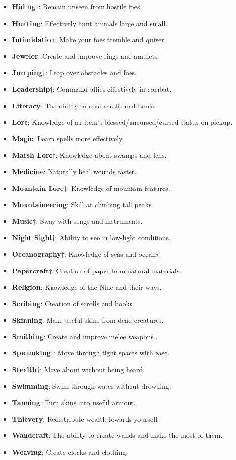 \begin{itemize}
\item {\bf Hiding}$\dagger$: Remain unseen from hostile foes.
\item {\bf Hunting}: Effectively hunt animals large and small. 
\item {\bf Intimidation}: Make your foes tremble and quiver. 
\item {\bf Jeweler}: Create and improve rings and amulets. 
\item {\bf Jumping}$\dagger$: Leap over obstacles and foes.
\item {\bf Leadership}$\dagger$: Command allies effectively in combat. 
\item {\bf Literacy}: The ability to read scrolls and books.
\item {\bf Lore}: Knowledge of an item's blessed/uncursed/cursed status on pickup.
\item {\bf Magic}: Learn spells more effectively. 
\item {\bf Marsh Lore}$\dagger$: Knowledge about swamps and fens. 
\item {\bf Medicine}: Naturally heal wounds faster. 
\item {\bf Mountain Lore}$\dagger$: Knowledge of mountain features. 
\item {\bf Mountaineering}: Skill at climbing tall peaks. 
\item {\bf Music}$\dagger$: Sway with songs and instruments. 
\item {\bf Night Sight}$\dagger$: Ability to see in low-light conditions. 
\item {\bf Oceanography}$\dagger$: Knowledge of seas and oceans. 
\item {\bf Papercraft}$\dagger$: Creation of paper from natural materials. 
\item {\bf Religion}: Knowledge of the Nine and their ways. 
\item {\bf Scribing}: Creation of scrolls and books. 
\item {\bf Skinning}: Make useful skins from dead creatures. 
\item {\bf Smithing}: Create and improve melee weapons.
\item {\bf Spelunking}$\dagger$: Move through tight spaces with ease.
\item {\bf Stealth}$\dagger$: Move about without being heard.
\item {\bf Swimming}: Swim through water without drowning.
\item {\bf Tanning}: Turn skins into useful armour.
\item {\bf Thievery}: Redistribute wealth towards yourself.
\item {\bf Wandcraft}: The ability to create wands and make the most of them.
\item {\bf Weaving}: Create cloaks and clothing.
\end{itemize}

